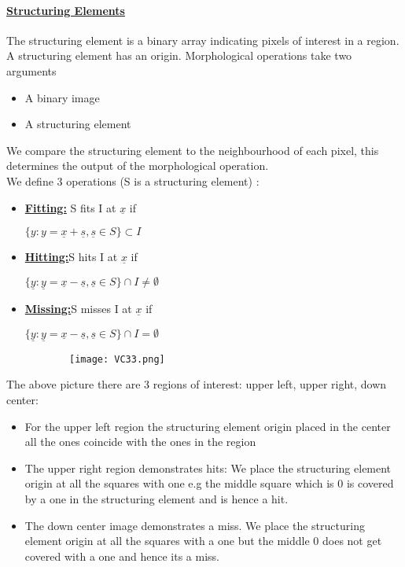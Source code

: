 \documentclass[8pt]{extreport}
\begin{document}
\paragraph{\underline{Structuring Elements}}The structuring element is a binary array indicating pixels of interest in a region. A structuring element has an origin. Morphological operations take two arguments
\begin{itemize}
\item A binary image
\item A structuring element
\end{itemize}
We compare the structuring element to the neighbourhood of each pixel, this determines the output of the morphological operation.\\    
We define 3 operations (S is a structuring element) :
\begin{itemize}
\item \underline{\textbf{Fitting:}} S fits I at $\underline{x}$ if
\begin{center}
$\{y:y = \underline{x} + \underline{s}, \underline{s} \in S\} \subset I$
\end{center}
\item \underline{\textbf{Hitting:}}S hits I at $\underline{x}$ if
\begin{center}
$\{\underline{y}:\underline{y} = \underline{x} - \underline{s}, \underline{s} \in S\} \cap I  \neq \emptyset$
\end{center}
\item \underline{\textbf{Missing:}}S misses I at $\underline{x}$ if
\begin{center}
$\{\underline{y}:\underline{y} = \underline{x} - \underline{s}, \underline{s} \in S\} \cap I  = \emptyset$
\end{center}
\end{itemize}

\begin{figure}[H]
\centering
\begin{subfigure}[b]{0.32\linewidth}
\texttt{[image: VC33.png]}
\end{subfigure}
\end{figure}
The above picture there are 3 regions of interest: upper left, upper right, down center:
\begin{itemize}
\item For the upper left region the structuring element origin placed in the center all the ones coincide with the ones in the region
\item The upper right region demonstrates hits: We place the structuring element origin at all the squares with one e.g the middle square which is 0 is covered by a one in the structuring element and is hence a hit.
\item The down center image demonstrates a miss. We place the structuring element origin at all the squares with a one but the middle 0 does not get covered with a one and hence its a miss.
\end{itemize}
\end{document}
